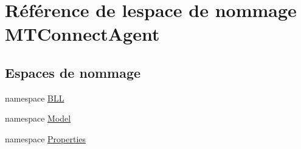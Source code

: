 \hypertarget{namespace_m_t_connect_agent}{}\section{Référence de l\textquotesingle{}espace de nommage M\+T\+Connect\+Agent}
\label{namespace_m_t_connect_agent}
\subsection*{Espaces de nommage}
\begin{DoxyCompactItemize}
\item 
namespace \mbox{\hyperlink{namespace_m_t_connect_agent_1_1_b_l_l}{B\+LL}}
\item 
namespace \mbox{\hyperlink{namespace_m_t_connect_agent_1_1_model}{Model}}
\item 
namespace \mbox{\hyperlink{namespace_m_t_connect_agent_1_1_properties}{Properties}}
\end{DoxyCompactItemize}
